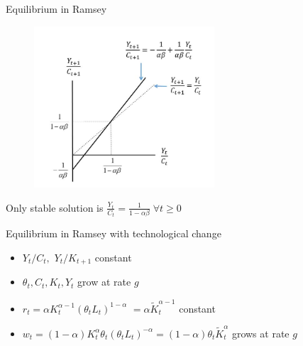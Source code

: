 \begin{frame}{Equilibrium in Ramsey}

\begin{figure}
\centering
\label{fig:ramsey_transversality}
\includegraphics[width=0.6\textwidth]{Figures/ramsey_transversality.JPG}
\end{figure}

Only stable solution is $\frac{Y_{t}}{C_{t}} = \frac{1}{1-\alpha \beta} \; \forall t\geq 0$

\end{frame}


\begin{frame}{Equilibrium in Ramsey with technological change}

\begin{itemize}
\item $Y_{t}/C_{t},$ $Y_{t}/K_{t+1}$ constant
\item $\theta _{t},C_{t},K_{t},Y_{t}$ grow at rate $g$
\item $r_{t}=\alpha K_{t}^{\alpha -1}\left( \theta _{t}L_{t}\right)^{1-\alpha }$ $=\alpha \tilde{K}_{t}^{\alpha -1}$ constant
\item $w_{t}=\left( 1-\alpha \right) K_{t}^{\alpha }\theta _{t}\left( \theta_{t}L_{t}\right) ^{-\alpha }=\left( 1-\alpha \right) \theta _{t}\tilde{K}_{t}^{\alpha }$ grows at rate $g$
\end{itemize}

\end{frame}


